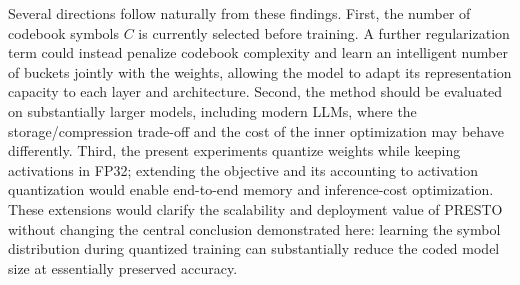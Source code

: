 \documentclass{article}
\begin{document}
Several directions follow naturally from these findings. First, the number of
codebook symbols $C$ is currently selected before training. A further
regularization term could instead penalize codebook complexity and learn an
intelligent number of buckets jointly with the weights, allowing the model to
adapt its representation capacity to each layer and architecture. Second, the
method should be evaluated on substantially larger models, including modern LLMs,
where the storage/compression trade-off and the cost of the inner optimization may
behave differently. Third, the present experiments quantize weights while keeping
activations in FP32; extending the objective and its accounting to activation
quantization would enable end-to-end memory and inference-cost optimization.
These extensions would clarify the scalability and deployment value of
PRESTO without changing the central conclusion demonstrated here: learning the
symbol distribution during quantized training can substantially reduce the coded
model size at essentially preserved accuracy.

\newpage
\end{document}
